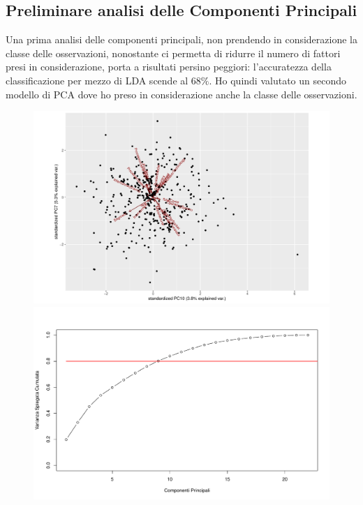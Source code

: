 \documentclass[11pt,a4paper]{article}
\begin{document}
\subsection{Preliminare analisi delle Componenti Principali}
Una prima analisi delle componenti principali, non prendendo in considerazione
la classe delle osservazioni, nonostante ci permetta di ridurre il numero di
fattori presi in considerazione, porta a risultati persino peggiori:
l'accuratezza della classificazione per mezzo di LDA scende al $68\%$. Ho quindi
valutato un secondo modello di PCA dove ho preso in considerazione anche la
classe delle osservazioni.
\begin{figure}[H]
	\hspace{-3.40cm}
	\begin{minipage}{0.73\textwidth}
		\includegraphics[scale=.45]{imgs/ggbiplot.pdf}
	\end{minipage}
	\begin{minipage}{0.5\textwidth}
		\includegraphics[scale=.38]{imgs/cumulative_variance.pdf}
	\end{minipage}
\end{figure}
\end{document}
